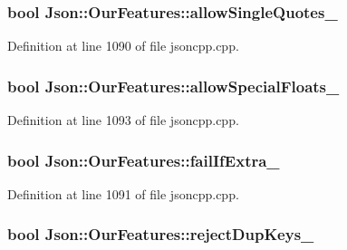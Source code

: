 \subsubsection[{\texorpdfstring{allow\+Single\+Quotes\+\_\+}{allowSingleQuotes_}}]{\setlength{\rightskip}{0pt plus 5cm}bool Json\+::\+Our\+Features\+::allow\+Single\+Quotes\+\_\+}\hypertarget{class_json_1_1_our_features_abbd6c196d7a22e2a360a59887eda4610}{}\label{class_json_1_1_our_features_abbd6c196d7a22e2a360a59887eda4610}


Definition at line 1090 of file jsoncpp.\+cpp.

\subsubsection[{\texorpdfstring{allow\+Special\+Floats\+\_\+}{allowSpecialFloats_}}]{\setlength{\rightskip}{0pt plus 5cm}bool Json\+::\+Our\+Features\+::allow\+Special\+Floats\+\_\+}\hypertarget{class_json_1_1_our_features_af760f91cc2a7af37e44f78fb466061bb}{}\label{class_json_1_1_our_features_af760f91cc2a7af37e44f78fb466061bb}


Definition at line 1093 of file jsoncpp.\+cpp.

\subsubsection[{\texorpdfstring{fail\+If\+Extra\+\_\+}{failIfExtra_}}]{\setlength{\rightskip}{0pt plus 5cm}bool Json\+::\+Our\+Features\+::fail\+If\+Extra\+\_\+}\hypertarget{class_json_1_1_our_features_ae8ad25b90706c78f1a8fe929191ac61b}{}\label{class_json_1_1_our_features_ae8ad25b90706c78f1a8fe929191ac61b}


Definition at line 1091 of file jsoncpp.\+cpp.

\subsubsection[{\texorpdfstring{reject\+Dup\+Keys\+\_\+}{rejectDupKeys_}}]{\setlength{\rightskip}{0pt plus 5cm}bool Json\+::\+Our\+Features\+::reject\+Dup\+Keys\+\_\+}\hypertarget{class_json_1_1_our_features_a39b8e0b86b1c24a45e800c023bb715aa}{}\label{class_json_1_1_our_features_a39b8e0b86b1c24a45e800c023bb715aa}


